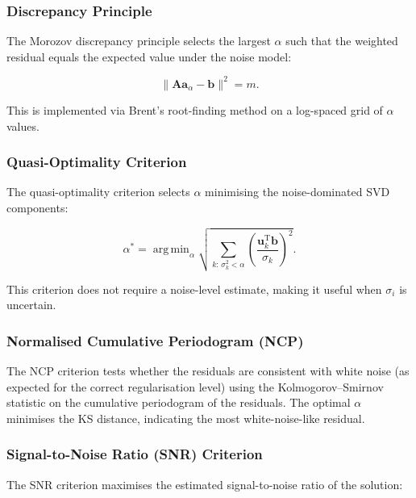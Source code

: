 \documentclass[a4paper,11pt]{article}
\DeclareMathOperator*{\argmin}{arg\,min}
\begin{document}
\subsubsection{Discrepancy Principle}

The Morozov discrepancy principle \citep{morozov1966choice} selects the
largest $\alpha$ such that the weighted residual equals the expected
value under the noise model:

\begin{equation}
  \|\bm{A}\bm{a}_\alpha - \bm{b}\|^2 = m.
\end{equation}

This is implemented via Brent's root-finding method on a log-spaced
grid of $\alpha$ values.

\subsubsection{Quasi-Optimality Criterion}

The quasi-optimality criterion \citep{hochstenbach2015filtering}
selects $\alpha$ minimising the noise-dominated SVD components:

\begin{equation}
  \alpha^* = \argmin_\alpha \sqrt{\sum_{k:\,\sigma_k^2 < \alpha}
    \left(\frac{\bm{u}_k^\mathrm{T}\bm{b}}{\sigma_k}\right)^2}.
\end{equation}

This criterion does not require a noise-level estimate, making it useful
when $\sigma_i$ is uncertain.

\subsubsection{Normalised Cumulative Periodogram (NCP)}

The NCP criterion tests whether the residuals are consistent with white
noise (as expected for the correct regularisation level) using the
Kolmogorov--Smirnov statistic on the cumulative periodogram of the
residuals.  The optimal $\alpha$ minimises the KS distance, indicating
the most white-noise-like residual.

\subsubsection{Signal-to-Noise Ratio (SNR) Criterion}

The SNR criterion maximises the estimated signal-to-noise ratio of the
solution:
\end{document}
